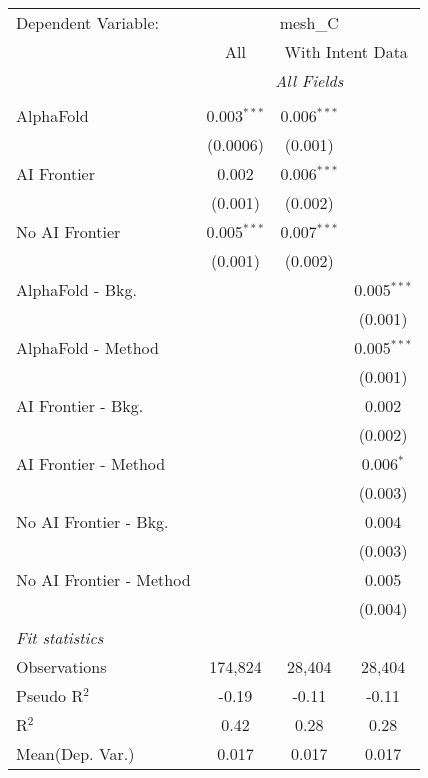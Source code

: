 \begingroup
\centering
\begin{tabular}{lccc}
   \tabularnewline \midrule \midrule
   Dependent Variable: & \multicolumn{3}{c}{mesh\_C}\\
 & \multicolumn{1}{c}{All} & \multicolumn{2}{c}{With Intent Data} \\
\cmidrule(lr){2-2} \cmidrule(lr){3-4}
 & \multicolumn{3}{c}{\textit{All Fields}} \\ \\
   AlphaFold               & 0.003$^{***}$ & 0.006$^{***}$ &   \\   
                           & (0.0006)      & (0.001)       &   \\   
   AI Frontier             & 0.002         & 0.006$^{***}$ &   \\   
                           & (0.001)       & (0.002)       &   \\   
   No AI Frontier          & 0.005$^{***}$ & 0.007$^{***}$ &   \\   
                           & (0.001)       & (0.002)       &   \\   
   AlphaFold - Bkg.        &               &               & 0.005$^{***}$\\   
                           &               &               & (0.001)\\   
   AlphaFold - Method      &               &               & 0.005$^{***}$\\   
                           &               &               & (0.001)\\   
   AI Frontier - Bkg.      &               &               & 0.002\\   
                           &               &               & (0.002)\\   
   AI Frontier - Method    &               &               & 0.006$^{*}$\\   
                           &               &               & (0.003)\\   
   No AI Frontier - Bkg.   &               &               & 0.004\\   
                           &               &               & (0.003)\\   
   No AI Frontier - Method &               &               & 0.005\\   
                           &               &               & (0.004)\\   
   \midrule
   \emph{Fit statistics}\\
   Observations            & 174,824       & 28,404        & 28,404\\  
   Pseudo R$^2$            & -0.19         & -0.11         & -0.11\\  
   R$^2$                   & 0.42          & 0.28          & 0.28\\  
Mean(Dep. Var.) & 0.017 & 0.017 & 0.017 \\
   

\end{tabular}
